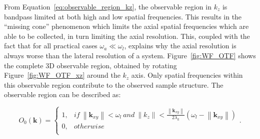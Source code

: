 From Equation~\ref{eq:observable_region_kz}, the observable
region in $k_{z}$ is bandpass limited at both high and low spatial frequencies.
This results in the ``missing cone'' phenomenon which limits the axial spatial 
frequencies which are able to be collected, in turn limiting the axial 
resolution\cite{behan2009three,arnison20023d}. This, coupled with the fact that
for all practical cases $\omega_{a} \ll \omega_{l}$, explains why the axial resolution is
always worse than the lateral resolution of a system. Figure~\ref{fig:WF_OTF} 
shows the complete 3D observable region, obtained by rotating 
Figure~\ref{fig:WF_OTF_xz} around the $k_{z}$ axis. Only spatial frequencies
within this observable region contribute to the observed sample structure.
The observable region can be described as:

\begin{equation}\label{eq:observable region}
O_{0}(\textbf{k}) = 
\begin{cases}
1, & if~ \left\|\textbf{k}_{xy}\right\| < \omega_{l} ~and~ \left\|k_{z}\right\| < \frac{\left\|\textbf{k}_{xy}\right\|}{2\lambda_{k}}(\omega_{l} - \left\|\textbf{k}_{xy}\right\|)\\
0, & otherwise\\
\end{cases}.
\end{equation}

